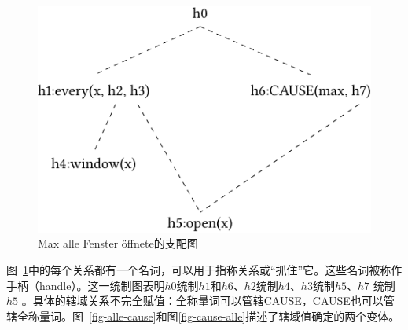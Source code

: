 \begin{figure}
\centering
\includegraphics{Figures/max-alle-fenster-oeffnete-mrs-cropped.pdf}
\caption{Max alle Fenster öffnete的支配图\label{Abbildung-Max-alle-Fenster-oeffnete}}
\end{figure}%
图~\ref{Abbildung-Max-alle-Fenster-oeffnete}中的每个关系都有一个名词，可以用于指称关系或“抓住”它。这些名词被称作手柄（handle）。这一统制图表明$h0$统制$h1$和$h6$、$h2$统制$h4$、$h3$统制$h5$、$h7$ 统制$h5$ 。具体的辖域关系不完全赋值：全称量词可以管辖CAUSE，CAUSE也可以管辖全称量词。图~\ref{fig-alle-cause}和图\ref{fig-cause-alle}描述了辖域值确定的两个变体。
